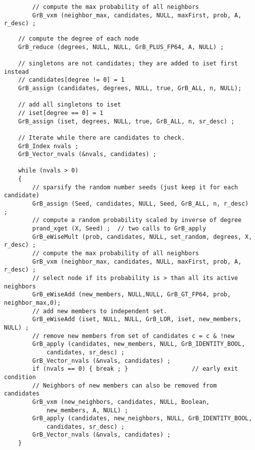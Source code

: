 \documentclass[12pt]{article}
\begin{document}
        {\footnotesize
        \begin{verbatim}
        // compute the max probability of all neighbors
        GrB_vxm (neighbor_max, candidates, NULL, maxFirst, prob, A, r_desc) ; \end{verbatim}}

\newpage
\begin{mdframed}[userdefinedwidth=6in]
{\footnotesize
\begin{verbatim}
    // compute the degree of each node
    GrB_reduce (degrees, NULL, NULL, GrB_PLUS_FP64, A, NULL) ;

    // singletons are not candidates; they are added to iset first instead
    // candidates[degree != 0] = 1
    GrB_assign (candidates, degrees, NULL, true, GrB_ALL, n, NULL);

    // add all singletons to iset
    // iset[degree == 0] = 1
    GrB_assign (iset, degrees, NULL, true, GrB_ALL, n, sr_desc) ;

    // Iterate while there are candidates to check.
    GrB_Index nvals ;
    GrB_Vector_nvals (&nvals, candidates) ;

    while (nvals > 0)
    {
        // sparsify the random number seeds (just keep it for each candidate) 
        GrB_assign (Seed, candidates, NULL, Seed, GrB_ALL, n, r_desc) ;
        // compute a random probability scaled by inverse of degree
        prand_xget (X, Seed) ;  // two calls to GrB_apply
        GrB_eWiseMult (prob, candidates, NULL, set_random, degrees, X, r_desc) ;
        // compute the max probability of all neighbors
        GrB_vxm (neighbor_max, candidates, NULL, maxFirst, prob, A, r_desc) ;
        // select node if its probability is > than all its active neighbors
        GrB_eWiseAdd (new_members, NULL,NULL, GrB_GT_FP64, prob, neighbor_max,0);
        // add new members to independent set.
        GrB_eWiseAdd (iset, NULL, NULL, GrB_LOR, iset, new_members, NULL) ;
        // remove new members from set of candidates c = c & !new
        GrB_apply (candidates, new_members, NULL, GrB_IDENTITY_BOOL,
            candidates, sr_desc) ;
        GrB_Vector_nvals (&nvals, candidates) ;
        if (nvals == 0) { break ; }                  // early exit condition
        // Neighbors of new members can also be removed from candidates
        GrB_vxm (new_neighbors, candidates, NULL, Boolean,
            new_members, A, NULL) ;
        GrB_apply (candidates, new_neighbors, NULL, GrB_IDENTITY_BOOL,
            candidates, sr_desc) ;
        GrB_Vector_nvals (&nvals, candidates) ;
    }
\end{verbatim}}
\end{mdframed}
\end{document}
